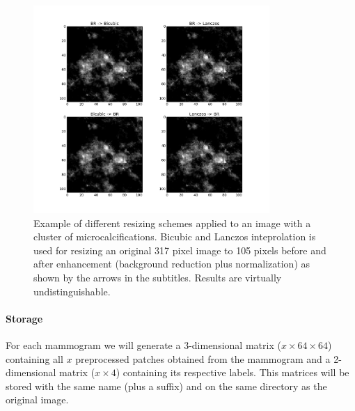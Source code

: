 \begin{figure}
	\centering
	\includegraphics [width = 0.8\textwidth]{plots/mcDiffResizings.png}
	\caption[Example of resizing schemes]{Example of different resizing schemes applied to an image with a cluster of microcalcifications. Bicubic and Lanczos inteprolation is used for resizing an original 317 pixel image to 105 pixels before and after enhancement (background reduction plus normalization) as shown by the arrows in the subtitles. Results are virtually undistinguishable.}
	\label{fig:ResizingInterps}
\end{figure}

\paragraph{Storage}
For each mammogram we will generate a 3-dimensional matrix ($x \times 64 \times 64$)  containing all $x$ preprocessed patches obtained from the mammogram and a 2-dimensional matrix ($x \times 4$) containing its respective labels. This matrices will be stored with the same name (plus a suffix) and on the same directory as the original image.

